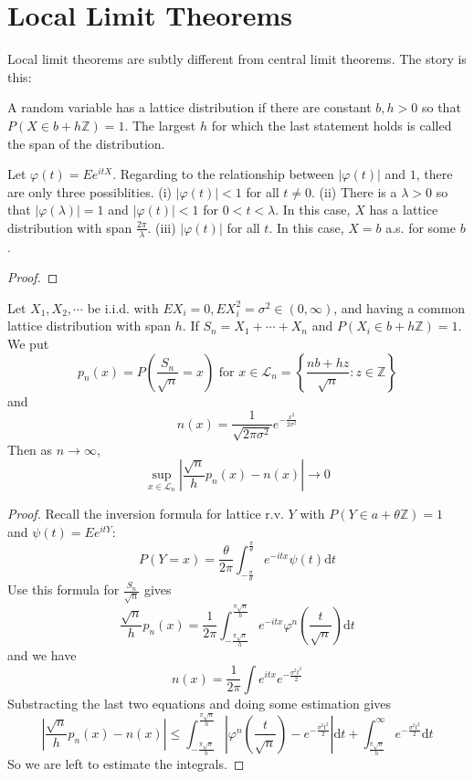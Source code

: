 \section{Local Limit Theorems}
Local limit theorems are subtly different from central limit theorems. The story is this:
\begin{example}
    
\end{example}
\begin{definition}
    A random variable has a lattice distribution if there are constant $b,h>0$ so that $P(X\in b+h\mathbb{Z})=1$.
    The largest $h$ for which the last statement holds is called the span of the distribution.
\end{definition}
\begin{theorem}
    Let $\varphi(t)=Ee^{itX}$. Regarding to the relationship between $\left|\varphi(t)\right|$ and $1$, there are only three possiblities.\newline 
    (i) $\left|\varphi(t)\right|<1$ for all $t\ne 0$.\newline 
    (ii) There is a $\lambda>0$ so that $\left|\varphi(\lambda)\right|=1$ and $\left|\varphi(t)\right|<1$ for $0<t<\lambda$. In this case,
    $X$ has a lattice distribution with span $\frac{2\pi}{\lambda}$.\newline 
    (iii) $\left|\varphi(t)\right|$ for all $t$. In this case, $X=b$ a.s. for some $b$.
\end{theorem}
\begin{proof}
    
\end{proof}

\begin{theorem}
    Let $X_1,X_2,\cdots$ be i.i.d. with $EX_i=0,EX_i^2=\sigma^2\in(0,\infty)$, and having a common lattice distribution with span $h$.
    If $S_n=X_1+\cdots+X_n$ and $P(X_i\in b+h\mathbb{Z})=1$. We put
    \[p_n(x)=P(\frac{S_n}{\sqrt{n}}=x)\text{  for  }x\in\mathcal{L}_n=\left\{\frac{nb+hz}{\sqrt{n}}:z\in\mathbb{Z}\right\}\] 
    and \[n(x)=\frac{1}{\sqrt{2\pi\sigma^2}}e^{-\frac{x^2}{2\sigma^2}}\] 
    Then as $n\to\infty$,\[\sup_{x\in\mathcal{L}_n}\left|\frac{\sqrt{n}}{h}p_n(x)-n(x)\right|\to 0\]
\end{theorem}
\begin{proof}
    Recall the inversion formula for lattice r.v. $Y$ with $P(Y\in a+\theta \mathbb{Z})=1$ and $\psi(t)=Ee^{itY}$:
    \[P(Y=x)=\frac{\theta}{2\pi}\int_{-\frac{\pi}{\theta}}^{\frac{\pi}{\theta}}e^{-itx}\psi(t)\mathrm{d}t\]
    Use this formula for $\frac{S_n}{\sqrt{n}}$ gives
    \[\frac{\sqrt{n}}{h}p_n(x)=\frac{1}{2\pi}\int_{-\frac{\pi\sqrt{n}}{h}}^{\frac{\pi\sqrt{n}}{h}}e^{-itx}\varphi^n(\frac{t}{\sqrt{n}})\mathrm{d}t\]
    and we have \[n(x)=\frac{1}{2\pi}\int e^{itx}e^{-\frac{\sigma^2t^2}{2}}\]
    Substracting the last two equations and doing some estimation gives 
    \[\left|\frac{\sqrt{n}}{h}p_n(x)-n(x)\right|\le \int_{-\frac{\pi\sqrt{n}}{h}}^{\frac{\pi\sqrt{n}}{h}}\left|\varphi^n(\frac{t}{\sqrt{n}})-e^{-\frac{\sigma^2t^2}{2}}\right|\mathrm{d}t+\int_{\frac{\pi\sqrt{n}}{h}}^\infty e^{-\frac{\sigma^2t^2}{2}}\mathrm{d}t\]
    So we are left to estimate the integrals.
\end{proof}

